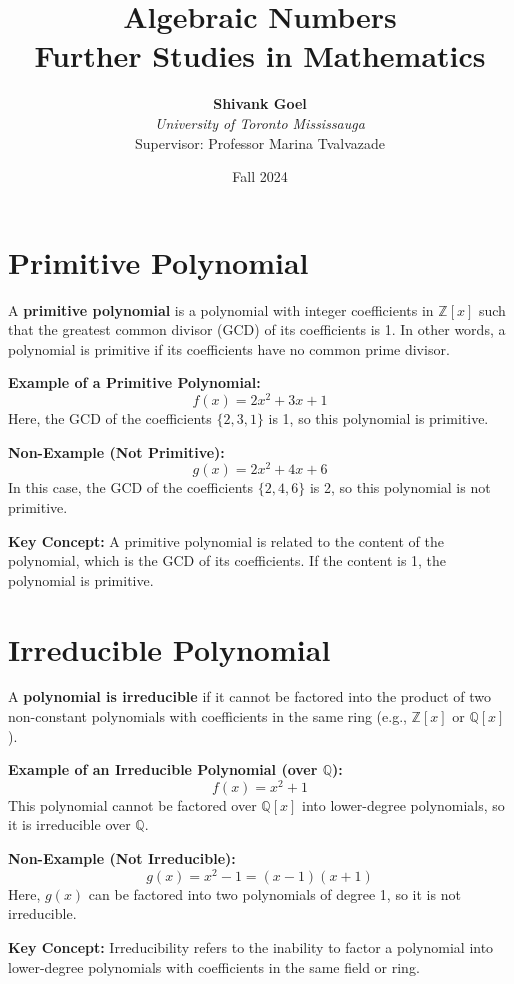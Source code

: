 \documentclass{article}
\title{\vspace{3cm} \textbf{Algebraic Numbers} \\[0.5cm] \large Further Studies in Mathematics}
\author{\textbf{Shivank Goel} \\ \textit{University of Toronto Mississauga} \\ Supervisor: Professor Marina Tvalvazade}
\date{\vspace{2cm} Fall 2024}
\begin{document}
\maketitle
\thispagestyle{empty} %
\newpage

\tableofcontents
\newpage



\section{Primitive Polynomial}
A \textbf{primitive polynomial} is a polynomial with integer coefficients in $\mathbb{Z}[x]$ such that the greatest common divisor (GCD) of its coefficients is 1. In other words, a polynomial is primitive if its coefficients have no common prime divisor.

\textbf{Example of a Primitive Polynomial:}
\[
f(x) = 2x^2 + 3x + 1
\]
Here, the GCD of the coefficients $\{2, 3, 1\}$ is 1, so this polynomial is primitive.

\textbf{Non-Example (Not Primitive):}
\[
g(x) = 2x^2 + 4x + 6
\]
In this case, the GCD of the coefficients $\{2, 4, 6\}$ is 2, so this polynomial is not primitive.

\textbf{Key Concept:} A primitive polynomial is related to the content of the polynomial, which is the GCD of its coefficients. If the content is 1, the polynomial is primitive.

\section{Irreducible Polynomial}
A \textbf{polynomial is irreducible} if it cannot be factored into the product of two non-constant polynomials with coefficients in the same ring (e.g., $\mathbb{Z}[x]$ or $\mathbb{Q}[x]$).

\textbf{Example of an Irreducible Polynomial (over $\mathbb{Q}$):}
\[
f(x) = x^2 + 1
\]
This polynomial cannot be factored over $\mathbb{Q}[x]$ into lower-degree polynomials, so it is irreducible over $\mathbb{Q}$.

\textbf{Non-Example (Not Irreducible):}
\[
g(x) = x^2 - 1 = (x - 1)(x + 1)
\]
Here, $g(x)$ can be factored into two polynomials of degree 1, so it is not irreducible.

\textbf{Key Concept:} Irreducibility refers to the inability to factor a polynomial into lower-degree polynomials with coefficients in the same field or ring.
\end{document}
